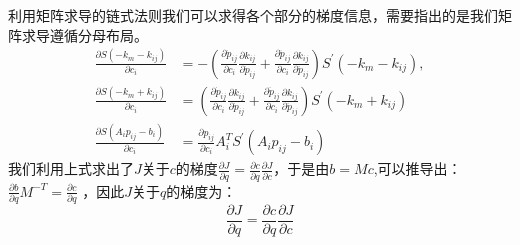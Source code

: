 \documentclass[master,academic]{ysuthesis} %
\begin{document}
		利用矩阵求导的链式法则我们可以求得各个部分的梯度信息，需要指出的是我们矩阵求导遵循分母布局。
		\begin{equation}
			\begin{aligned}
				\frac{\partial S( -k_m-k_{ij} )}{\partial c_i}&=-( \frac{\partial \dot{p}_{ij}}{\partial c_i}\frac{\partial k_{ij}}{\partial \dot{p}_{ij}}+\frac{\partial \ddot{p}_{ij}}{\partial c_i}\frac{\partial k_{ij}}{\partial \ddot{p}_{ij}} ) S^{'} ( -k_m-k_{ij} ) ,\\
				\frac{\partial S( -k_m+k_{ij} )}{\partial c_i}&=( \frac{\partial \dot{p}_{ij}}{\partial c_i}\frac{\partial k_{ij}}{\partial \dot{p}_{ij}}+\frac{\partial \ddot{p}_{ij}}{\partial c_i}\frac{\partial k_{ij}}{\partial \ddot{p}_{ij}} ) S^{'} ( -k_m+k_{ij} ) \\
				\frac{\partial S( A_ip_{ij}-b_i )}{\partial c_i}&=\frac{\partial p_{ij}}{\partial c_i}A_{i}^{T}S^{'}( A_ip_{ij}-b_i ) 
			\end{aligned}
		\end{equation}
		我们利用上式求出了$J$关于$c$的梯度$\frac{\partial J}{\partial q}=\frac{\partial c}{\partial q}\frac{\partial J}{\partial c}$，于是由$b = Mc$,可以推导出：$\frac{\partial b}{\partial q}M^{-T}=\frac{\partial c}{\partial q}$ ，因此$J$关于$q$的梯度为：
		\begin{equation}
			\frac{\partial J}{\partial q}=\frac{\partial c}{\partial q}\frac{\partial J}{\partial c}
		\end{equation}
		
		
\end{document}
